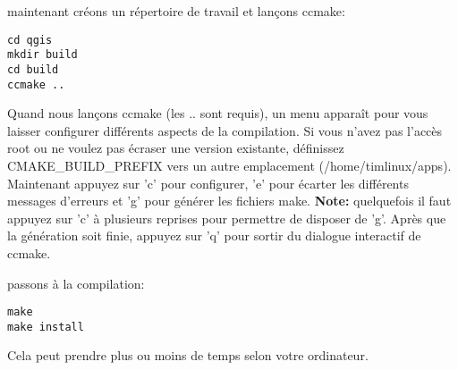 maintenant cr\'eons un r\'epertoire de travail et lan\c{c}ons ccmake:

\begin{verbatim}
cd qgis
mkdir build
cd build
ccmake ..
\end{verbatim}

Quand nous lan\c{c}ons ccmake (les .. sont requis), un menu appara\^it pour vous laisser configurer diff\'erents aspects de la compilation. Si vous n'avez pas l'acc\`es root ou ne voulez pas \'ecraser une version existante, d\'efinissez CMAKE\_BUILD\_PREFIX vers un autre emplacement (/home/timlinux/apps). Maintenant appuyez sur 'c' pour configurer, 'e' pour \'ecarter les diff\'erents messages d'erreurs et 'g' pour g\'en\'erer les fichiers make. \textbf{Note:} quelquefois il faut appuyez sur 'c' \`a plusieurs reprises pour permettre de disposer de 'g'.
Apr\`es que la g\'en\'eration soit finie, appuyez sur 'q' pour sortir du dialogue interactif de ccmake.

passons \`a la compilation:

\begin{verbatim}
make
make install
\end{verbatim}

Cela peut prendre plus ou moins de temps selon votre ordinateur.

% 
% 
% 
% 
% 
% 
% 
% 

